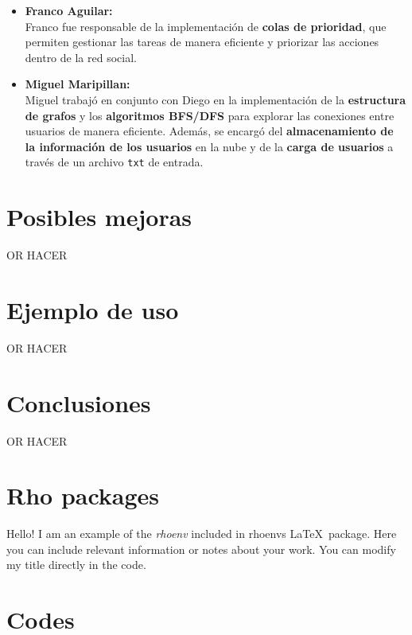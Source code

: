 \documentclass[9pt,letterpaper,onecolumn]{rho-class/rho}
\begin{document}
\begin{itemize}
        \item \textbf{Franco Aguilar:} \\
        Franco fue responsable de la implementación de \textbf{colas de prioridad}, que permiten gestionar las tareas de manera eficiente y priorizar las acciones dentro de la red social.
    
        \item \textbf{Miguel Maripillan:} \\
        Miguel trabajó en conjunto con Diego en la implementación de la \textbf{estructura de grafos} y los \textbf{algoritmos BFS/DFS} para explorar las conexiones entre usuarios de manera eficiente. Además, se encargó del \textbf{almacenamiento de la información de los usuarios} en la nube y de la \textbf{carga de usuarios} a través de un archivo \texttt{txt} de entrada.
    \end{itemize}

\section{Posibles mejoras}

    OR HACER

\section{Ejemplo de uso}

    OR HACER

\section{Conclusiones}

    OR HACER

    

\section{Rho packages}

        \begin{rhoenv}[frametitle=Environment with custom title]
            Hello! I am an example of the \textit{rhoenv} included in rhoenvs \LaTeX\ package. Here you can include relevant information or notes about your work. You can modify my title directly in the code.
        \end{rhoenv}

\section{Codes}
\end{document}
